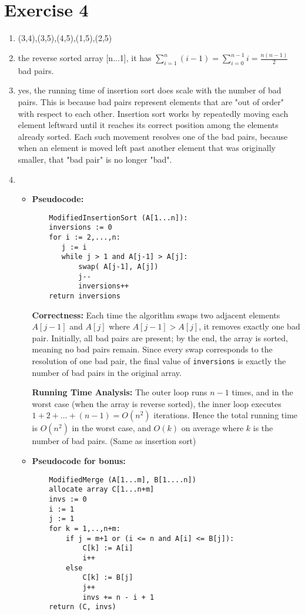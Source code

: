 \documentclass{article}
\begin{document}
\section*{Exercise 4}
\begin{enumerate}[label=\alph*)]
    \item (3,4),(3,5),(4,5),(1,5),(2,5)

    \item the reverse sorted array [n...1], it has $\sum_{i=1}^n (i-1) = \sum_{i=0}^{n-1} i = \frac{n(n-1)}{2}$ bad pairs.

    \item yes, the running time of insertion sort does scale with the number of bad pairs. This is because bad pairs represent elements that are "out of order" with respect to each other. 
    Insertion sort works by repeatedly moving each element leftward until it reaches its correct position among the elements already sorted. Each such movement resolves one of the bad pairs, because when an element is moved left past another element that was originally smaller, that "bad pair" is no longer "bad".

\item \begin{itemize}
    \item 
\textbf{Pseudocode:}
\begin{verbatim}
    ModifiedInsertionSort (A[1...n]):
    inversions := 0
    for i := 2,...,n:
       j := i
       while j > 1 and A[j-1] > A[j]:
           swap( A[j-1], A[j])
           j--
           inversions++
    return inversions
\end{verbatim}

\textbf{Correctness:} 
Each time the algorithm swaps two adjacent elements $A[j-1]$ and $A[j]$ where $A[j-1] > A[j]$, it removes exactly one bad pair.  
Initially, all bad pairs are present; by the end, the array is sorted, meaning no bad pairs remain.  
Since every swap corresponds to the resolution of one bad pair, the final value of \texttt{inversions} is exactly the number of bad pairs in the original array.

\textbf{Running Time Analysis:}  
The outer loop runs $n-1$ times, and in the worst case (when the array is reverse sorted), 
the inner loop executes $1 + 2 + \dots + (n-1) = O(n^2)$ iterations.  
Hence the total running time is $O(n^2)$ in the worst case, and $O(k)$ on average where $k$ is the number of bad pairs. (Same as insertion sort)

    \item \textbf{Pseudocode for bonus:}
  \begin{verbatim}    
    ModifiedMerge (A[1...m], B[1....n]) 
    allocate array C[1...n+m]
    invs := 0
    i := 1
    j := 1
    for k = 1,..,n+m:
        if j = m+1 or (i <= n and A[i] <= B[j]):
            C[k] := A[i]
            i++
        else
            C[k] := B[j]
            j++
            invs += n - i + 1
    return (C, invs)
    

\end{verbatim}
\end{itemize}
\end{enumerate}
\end{document}
